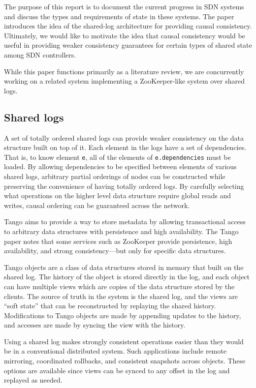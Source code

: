 \documentclass[letterpaper,twocolumn,10pt]{article}
\begin{document}
The purpose of this report is to document the current progress in SDN systems and discuss the types and requirements of state in these systems. The paper introduces the idea of the shared-log architecture for providing causal consistency. Ultimately, we would like to motivate the idea that causal consistency would be useful in providing weaker consistency guarantees for certain types of shared state among SDN controllers.

While this paper functions primarily as a literature review, we are concurrently working on a related system implementing a ZooKeeper-like system over shared logs.

\subsection{Shared logs}

A set of totally ordered shared logs can provide weaker consistency on the data structure built on top of it. Each element in the logs have a set of dependencies. That is, to know element \verb_e_, all of the elements of \verb_e.dependencies_ must be loaded.  By allowing dependencies to be specified between elements of various shared logs, arbitrary partial orderings of nodes can be constructed while preserving the convenience of having totally ordered logs. By carefully selecting what operations on the higher level data structure require global reads and writes, causal ordering can be guaranteed across the network.

Tango \cite{Tango} aims to provide a way to store metadata by allowing transactional access to arbitrary data structures with persistence and high availability. The Tango paper notes that some services such as ZooKeeper \cite{hunt2010zookeeper} provide persistence, high availability, and strong consistency---but only for specific data structures.

Tango objects are a class of data structures stored in memory that built on the shared log. The history of the object is stored directly in the log, and each object can have multiple views which are copies of the data structure stored by the clients. The source of truth in the system is the shared log, and the views are ``soft state'' that can be reconstructed by replaying the shared history. Modifications to Tango objects are made by appending updates to the history, and accesses are made by syncing the view with the history.

Using a shared log makes strongly consistent operations easier than they would be in a conventional distributed system. Such applications include remote mirroring, coordinated rollbacks, and consistent snapshots across objects. These options are available since views can be synced to any offset in the log and replayed as needed.
\end{document}
